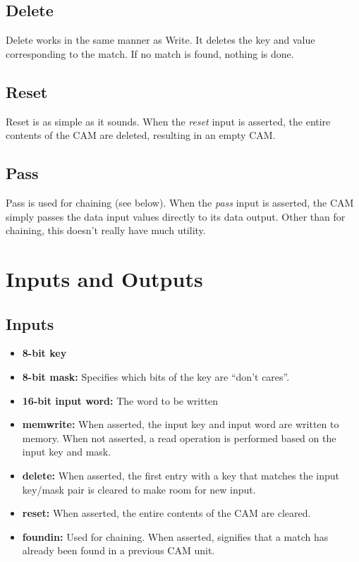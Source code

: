 \documentclass{article}
\begin{document}
  \subsection{Delete}

  Delete works in the same manner as Write.  It deletes the key and value
  corresponding to the match.  If no match is found, nothing is done.

  \subsection{Reset}

  Reset is as simple as it sounds.  When the {\it reset} input is asserted, the
  entire contents of the CAM are deleted, resulting in an empty CAM.

  \subsection{Pass}

  Pass is used for chaining (see below).  When the {\it pass} input is asserted,
  the CAM simply passes the data input values directly to its data output.
  Other than for chaining, this doesn't really have much utility.

  \section{Inputs and Outputs}

  \subsection*{Inputs}
  \begin{itemize}
    \item \textbf{8-bit key}
    \item \textbf{8-bit mask:}
      Specifies which bits of the key are ``don't cares''.
    \item \textbf{16-bit input word:}
      The word to be written
    \item \textbf{memwrite:}
      When asserted, the input key and input word are written to memory.  When
      not asserted, a read operation is performed based on the input key and
      mask.
    \item \textbf{delete:}
      When asserted, the first entry with a key that matches the input key/mask
      pair is cleared to make room for new input.
    \item \textbf{reset:}
      When asserted, the entire contents of the CAM are cleared.
    \item \textbf{foundin:}
      Used for chaining.  When asserted, signifies that a match has already
      been found in a previous CAM unit.
  \end{itemize}
\end{document}
